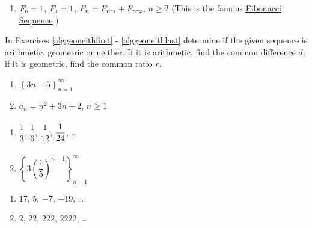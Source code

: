 \begin{enumerate}
\setcounter{enumi}{\value{HW}}

\item  $F_{\mbox{\tiny$0$}} = 1$, $F_{\mbox{\tiny$1$}} = 1$, $F_{n} = F_{n\mbox{-\tiny$1$}} + F_{n\mbox{-\tiny$2$}}$, $n \geq 2$  (This is the famous \href{http://en.wikipedia.org/wiki/Fibonacci_number}{\underline{Fibonacci Sequence}} ) \label{writeoutseqlast}

\setcounter{HW}{\value{enumi}}
\end{enumerate}


In Exercises \ref{alggeoneithfirst} - \ref{alggeoneithlast} determine if the given sequence is arithmetic, geometric or neither.  If it is arithmetic, find the common difference $d$; if it is geometric, find the common ratio $r$.

\begin{multicols}{2}
\begin{enumerate}
\setcounter{enumi}{\value{HW}}

 
\item  $\left\{ 3n-5 \right\}_{n=1}^{\infty}$ \label{alggeoneithfirst}

\item  $a_{n} = n^2+3n+2$, $n \geq 1$

\setcounter{HW}{\value{enumi}}
\end{enumerate}
\end{multicols}

\begin{multicols}{2}
\begin{enumerate}
\setcounter{enumi}{\value{HW}}


\item  $\dfrac{1}{3}$, $\dfrac{1}{6}$, $\dfrac{1}{12}$, $\dfrac{1}{24} \vphantom{\left\{ 3 \left(\dfrac{1}{5}\right)^{n-1} \right\}_{n=1}^{\infty}}$, \ldots

\item  $\left\{ 3 \left(\dfrac{1}{5}\right)^{n-1} \right\}_{n=1}^{\infty}$

\setcounter{HW}{\value{enumi}}
\end{enumerate}
\end{multicols}

\begin{multicols}{2}
\begin{enumerate}
\setcounter{enumi}{\value{HW}}


\item  $17$, $5$, $-7$, $-19$, \ldots

\item  $2$, $22$, $222$, $2222$, \ldots

\setcounter{HW}{\value{enumi}}
\end{enumerate}
\end{multicols}

